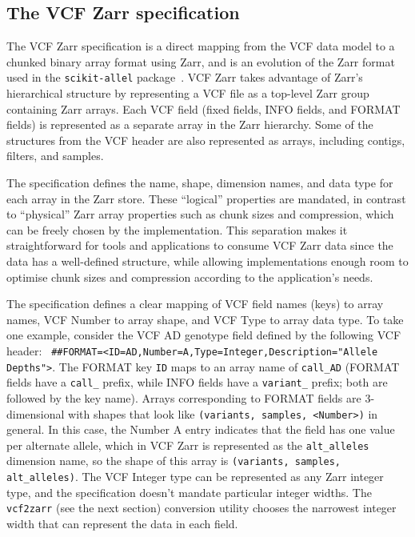 \documentclass[a4paper,num-refs]{oup-contemporary}
\begin{document}
\subsection{The VCF Zarr specification}
The VCF Zarr specification is a direct mapping from the VCF data model
to a chunked binary array format using Zarr,
and is an evolution of the Zarr format used in the \texttt{scikit-allel}
package~\citep{miles2023scikit}.
VCF Zarr takes advantage
of Zarr's hierarchical structure by representing a VCF file as a top-level
Zarr group containing Zarr arrays. Each VCF field (fixed fields, INFO fields,
and FORMAT fields) is represented as a separate array in the Zarr hierarchy.
Some of the structures from the VCF header are also represented as arrays,
including contigs, filters, and samples.

The specification defines the name, shape, dimension names, and data type
for each array in the Zarr store. These ``logical'' properties are mandated,
in contrast to ``physical'' Zarr array properties such as chunk sizes and
compression, which can be freely chosen by the implementation. This
separation makes it straightforward for tools and applications to consume
VCF Zarr data since the data has a well-defined structure, while allowing
implementations enough room to optimise chunk sizes and compression
according to the application's needs.

The specification defines a clear mapping of VCF field names (keys) to
array names, VCF Number to array shape, and VCF Type to array data type.
To take one example, consider the VCF AD genotype field defined by the
following VCF header: \texttt{
\#\#FORMAT=<ID=AD,Number=A,Type=Integer,Description="Allele Depths">}.
The FORMAT key \texttt{ID} maps to an array name of \texttt{call\_AD}
(FORMAT fields have a \texttt{call\_} prefix, while INFO fields have a
\texttt{variant\_} prefix; both are followed by the key name). Arrays
corresponding to FORMAT fields are 3-dimensional with shapes that look
like \texttt{(variants, samples, <Number>)} in general. In this case, the
Number A entry indicates that the field has one value per alternate allele,
which in VCF Zarr is represented as the \texttt{alt\_alleles} dimension name,
so the shape of this array is \texttt{(variants, samples, alt\_alleles)}.
The VCF Integer type can be represented as any Zarr integer type, 
and the specification doesn't mandate particular integer widths. 
The \texttt{vcf2zarr} (see the next section) conversion utility 
chooses the narrowest integer width that can represent the data in
each field.
\end{document}
